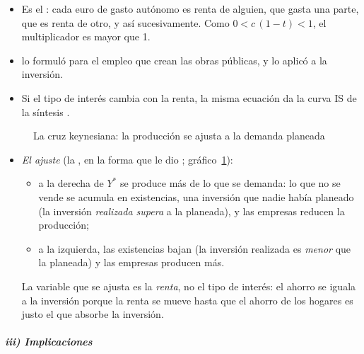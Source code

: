 \documentclass[11pt]{article}
\begin{document}
\begin{itemize}
  \begin{itemize}
  \item Es el : cada euro de gasto autónomo es renta de alguien, que gasta una parte, que es renta de otro, y así sucesivamente. Como $0<c\,(1-t)<1$, el multiplicador es mayor que 1.
  \item \textcite{Kahn1931Relation} lo formuló para el empleo que crean las obras públicas, y  lo aplicó a la inversión\nocite{Keynes1936}.
  \item Si el tipo de interés cambia con la renta, la misma ecuación da la curva IS de la síntesis .
  \end{itemize}
\end{itemize}

\begin{figure}[H]
\centering
\caption{La cruz keynesiana: la producción se ajusta a la demanda planeada}\label{fig:cruz}
\end{figure}

\begin{itemize}
\item \emph{El ajuste} (la , en la forma que le dio \textcite{Samuelson1948Economics}; gráfico~\ref{fig:cruz}):
  \begin{itemize}
  \item a la derecha de $Y^*$ se produce más de lo que se demanda: lo que no se vende se acumula en existencias, una inversión que nadie había planeado (la inversión \emph{realizada supera} a la planeada), y las empresas reducen la producción;
  \item a la izquierda, las existencias bajan (la inversión realizada es \emph{menor} que la planeada) y las empresas producen más.
  \end{itemize}
  La variable que se ajusta es la \emph{renta}, no el tipo de interés: el ahorro se iguala a la inversión porque la renta se mueve hasta que el ahorro de los hogares es justo el que absorbe la inversión.
\end{itemize}

\subparagraph{iii) Implicaciones}
\end{document}
